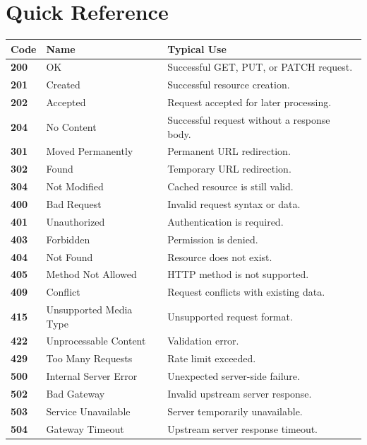\documentclass[a4paper]{article}
\begin{document}
    
    \section{Quick Reference}
        
        \begin{center}
            \begin{longtable}{
                    >{\ttfamily\bfseries}p{1.5cm}
                p{4cm}
                p{8cm}
            }
                \toprule
                \textnormal{\textbf{Code}} &
                \textbf{Name} &
                \textbf{Typical Use} \\
                \midrule
                200 & OK & Successful GET, PUT, or PATCH request. \\
                201 & Created & Successful resource creation. \\
                202 & Accepted & Request accepted for later processing. \\
                204 & No Content & Successful request without a response body. \\
                301 & Moved Permanently & Permanent URL redirection. \\
                302 & Found & Temporary URL redirection. \\
                304 & Not Modified & Cached resource is still valid. \\
                400 & Bad Request & Invalid request syntax or data. \\
                401 & Unauthorized & Authentication is required. \\
                403 & Forbidden & Permission is denied. \\
                404 & Not Found & Resource does not exist. \\
                405 & Method Not Allowed & HTTP method is not supported. \\
                409 & Conflict & Request conflicts with existing data. \\
                415 & Unsupported Media Type & Unsupported request format. \\
                422 & Unprocessable Content & Validation error. \\
                429 & Too Many Requests & Rate limit exceeded. \\
                500 & Internal Server Error & Unexpected server-side failure. \\
                502 & Bad Gateway & Invalid upstream server response. \\
                503 & Service Unavailable & Server temporarily unavailable. \\
                504 & Gateway Timeout & Upstream server response timeout. \\
                \bottomrule
            \end{longtable}
        \end{center}
        
        
        
\end{document}
